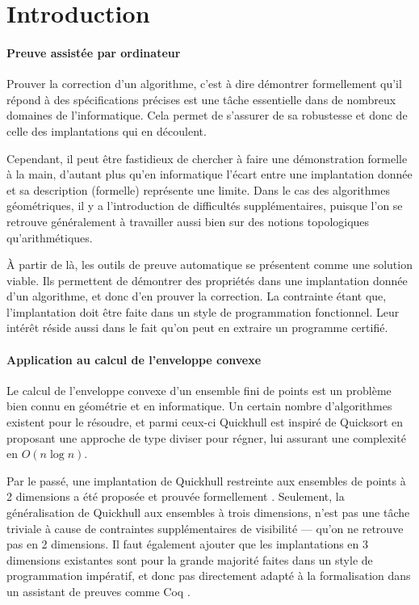 \documentclass[]{article}
\begin{document}
\newpage

\newpage
\tableofcontents
\newpage

\section{Introduction}
\paragraph{Preuve assistée par ordinateur}
Prouver la correction d'un algorithme, c'est à dire démontrer formellement qu'il répond à des spécifications précises est une tâche essentielle dans de nombreux domaines de l'informatique. Cela permet de s'assurer de sa robustesse et donc de celle des implantations qui en découlent.

Cependant, il peut être fastidieux de chercher à faire une démonstration formelle à la main, d'autant plus qu'en informatique l'écart entre une implantation donnée et sa description (formelle) représente une limite. Dans le cas des algorithmes géométriques, il y a l'introduction de difficultés supplémentaires, puisque l'on se retrouve généralement à travailler aussi bien sur des notions topologiques qu'arithmétiques.

À partir de là, les outils de preuve automatique se présentent comme une solution viable. Ils permettent de démontrer des propriétés dans une implantation donnée d'un algorithme, et donc d'en prouver la correction. La contrainte étant que, l'implantation doit être faite dans un style de programmation fonctionnel. Leur intérêt réside aussi dans le fait qu'on peut en extraire un programme certifié.

\paragraph{Application au calcul de l'enveloppe convexe}
Le calcul de l'enveloppe convexe d'un ensemble fini de points est un problème bien connu en géométrie et en informatique. Un certain nombre d'algorithmes existent pour le résoudre, et parmi ceux-ci Quickhull est inspiré de Quicksort en proposant une approche de type diviser pour régner, lui assurant une complexité en $O(n\log{}n)$.

Par le passé, une implantation de Quickhull restreinte aux ensembles de points à 2 dimensions a été proposée et prouvée formellement \cite{brun:hal-00955400, brun:hal-00916880}. Seulement, la généralisation de Quickhull aux ensembles à trois dimensions, n'est pas une tâche triviale à cause de contraintes supplémentaires de visibilité — qu'on ne retrouve pas en 2 dimensions. Il faut également ajouter que les implantations en 3 dimensions existantes sont pour la grande majorité faites dans un style de programmation impératif, et donc pas directement adapté à la formalisation dans un assistant de preuves comme Coq \cite{coqref}.
\end{document}
